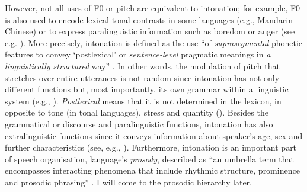 However, not all uses of F0 or pitch are equivalent to intonation; for example, F0 is also used to encode lexical tonal contrasts in some languages (e.g., Mandarin Chinese) or to express paralinguistic information such as boredom or anger (see e.g. \citealt{Arvaniti2022}). More precisely, intonation is defined as the use “of \textit{suprasegmental} phonetic features to convey ‘postlexical’ or \textit{sentence-level} pragmatic meanings in \textit{a linguistically structured} way” \citep[4]{Ladd2008}. In other words, the modulation of pitch that stretches over entire utterances is not random since intonation has not only different functions but, most importantly, its own grammar within a linguistic system (e.g., \citealt{Bolinger1957, Pierrehumbert1980}). \textit{Postlexical} means that it is not determined in the lexicon, in opposite to tone (in tonal languages), stress and quantity (\citealt{HirstDiCristo1998}). Besides the grammatical or discourse and paralinguistic functions, intonation has also extralinguistic functions since it conveys information about speaker’s age, sex and further characteristics (see, e.g., \citealt[47]{Chun2002}). Furthermore, intonation is an important part of speech organisation, language’s \textit{prosody}, described as “an umbrella term that encompasses interacting phenomena that include rhythmic structure, prominence and prosodic phrasing” \citep[25]{Arvaniti2022}. I will come to the prosodic hierarchy later.



